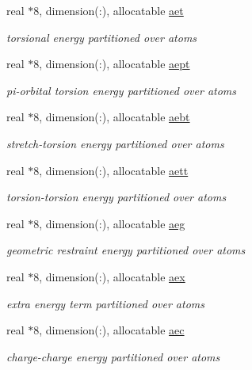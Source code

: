 \begin{DoxyCompactItemize}
real $\ast$8, dimension(\-:), allocatable \hyperlink{classanalyz_a7083d5d6229520f4ce5208e5391a586e}{aet}
\begin{DoxyCompactList}\small\item\em torsional energy partitioned over atoms \end{DoxyCompactList}\item 
real $\ast$8, dimension(\-:), allocatable \hyperlink{classanalyz_adc598ba1a8b6819a2f05b464e8bad797}{aept}
\begin{DoxyCompactList}\small\item\em pi-\/orbital torsion energy partitioned over atoms \end{DoxyCompactList}\item 
real $\ast$8, dimension(\-:), allocatable \hyperlink{classanalyz_a6c9179d6da04ccbf1fa2ee6e7b52bfed}{aebt}
\begin{DoxyCompactList}\small\item\em stretch-\/torsion energy partitioned over atoms \end{DoxyCompactList}\item 
real $\ast$8, dimension(\-:), allocatable \hyperlink{classanalyz_aca08ee87eb6dd9428985460060eeef30}{aett}
\begin{DoxyCompactList}\small\item\em torsion-\/torsion energy partitioned over atoms \end{DoxyCompactList}\item 
real $\ast$8, dimension(\-:), allocatable \hyperlink{classanalyz_a1e1a7a2111e6f4702533d6deb15a5751}{aeg}
\begin{DoxyCompactList}\small\item\em geometric restraint energy partitioned over atoms \end{DoxyCompactList}\item 
real $\ast$8, dimension(\-:), allocatable \hyperlink{classanalyz_a8bf35580c54258544088a97228ab374d}{aex}
\begin{DoxyCompactList}\small\item\em extra energy term partitioned over atoms \end{DoxyCompactList}\item 
real $\ast$8, dimension(\-:), allocatable \hyperlink{classanalyz_a417c64c5509dfd34fd15ed7d2ff8f54e}{aec}
\begin{DoxyCompactList}\small\item\em charge-\/charge energy partitioned over atoms \end{DoxyCompactList}\item 

\end{DoxyCompactItemize}
